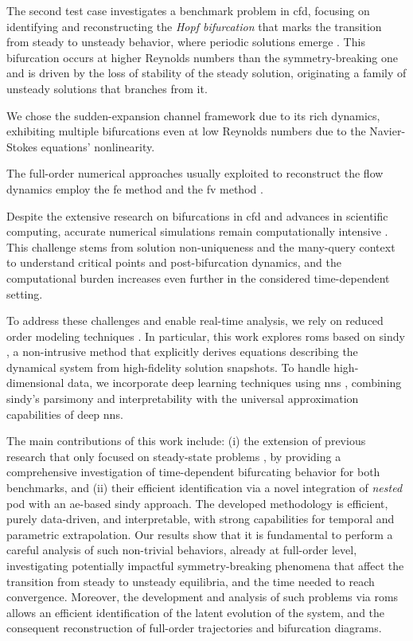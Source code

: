 \documentclass[reqno]{amsart}[standalone]
\theoremstyle{definition}
\theoremstyle{remark}
\begin{document}
The second test case investigates a benchmark problem in \gls{cfd}, focusing on identifying and reconstructing the \textit{Hopf bifurcation} that marks the transition from steady to unsteady behavior, where periodic solutions emerge \parencite{QUAINI}.
This bifurcation occurs at higher Reynolds numbers than the symmetry-breaking one and is driven by the loss of stability of the steady solution, originating a family of unsteady solutions that branches from it.
%

We chose the sudden-expansion channel framework due to its rich dynamics, exhibiting multiple bifurcations even at low Reynolds numbers due to the Navier-Stokes equations' nonlinearity.
%

The full-order numerical approaches usually exploited to reconstruct the flow dynamics employ the \gls{fe} method \parencite{Quarteroni_2017} and the \gls{fv} method \parencite{FVM}.

Despite the extensive research on bifurcations in \gls{cfd} and advances in scientific computing, accurate numerical simulations remain computationally intensive \parencite{TESIFP}.
This challenge stems from solution non-uniqueness and the many-query context to understand critical points and post-bifurcation dynamics, and the computational burden increases even further in the considered time-dependent setting.

To address these challenges and enable real-time analysis, we rely on reduced order modeling techniques \parencite{hesthaven_certified_2015,quarteroni_reduced_2016,RozzaBallarinScandurraPichi2024}. In particular, this work explores \glspl{rom} based on \gls{sindy} \parencite{Brunton_2016}, a non-intrusive method that explicitly derives equations describing the dynamical system from high-fidelity solution snapshots. To handle high-dimensional data, we incorporate deep learning techniques using \glspl{nn} \parencite{Champion_2019, DEEPDELAY, Conti_2023}, combining \gls{sindy}'s parsimony and interpretability with the universal approximation capabilities of deep \glspl{nn}.

%
The main contributions of this work include: (i) the extension of previous research that only focused on steady-state problems \parencite{TESIFP, Khamlich_2022, PICHI2023105813, gonnella2025stochasticperturbationapproachnonlinear}, by providing a comprehensive investigation of time-dependent bifurcating behavior for both benchmarks, and (ii) their efficient identification via a novel integration of \emph{nested} \gls{pod} \parencite{nested_POD1, nested_POD2} with an \gls{ae}-based \gls{sindy} approach. The developed methodology is efficient, purely data-driven, and interpretable, with strong capabilities for temporal and parametric extrapolation.
Our results show that it is fundamental to perform a careful analysis of such non-trivial behaviors, already at full-order level, investigating potentially impactful symmetry-breaking phenomena that affect the transition from steady to unsteady equilibria, and the time needed to reach convergence.
%
%
Moreover, the development and analysis of such problems via \glspl{rom} allows an efficient identification of the latent evolution of the system, and the consequent reconstruction of full-order trajectories and bifurcation diagrams.
\end{document}

